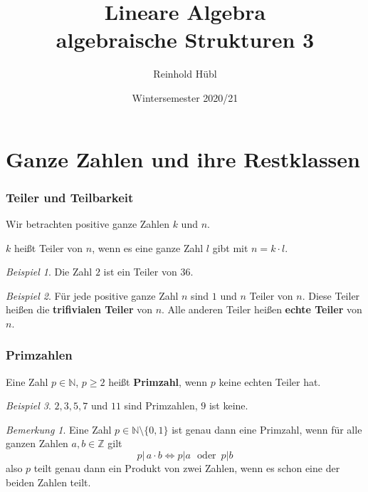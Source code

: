\documentclass[hyperref={pdfpagelabels=false}]{beamer}
\title{Lineare Algebra \\ algebraische Strukturen 3}
\author{ Reinhold Hübl}
\date{Wintersemester 2020/21}
\theoremstyle{plain}%
\theoremstyle{definition}
\theoremstyle{remark}
\newtheorem*{beispiel}{Beispiel}
\newtheorem*{notiz}{Bemerkung}
\begin{document}
\begin{frame}
\titlepage
\centering 
 
\end{frame} 



\section{Ganze Zahlen und ihre Restklassen}


\begin{frame}
\frametitle{Teiler und Teilbarkeit}

Wir betrachten positive ganze Zahlen $k$ und $n$. 

\begin{definition}  $k$ heißt Teiler von $n$, wenn es eine ganze Zahl $l$ gibt mit $n = k \cdot l$. 
\end{definition}

\pause 
\begin{beispiel} Die Zahl $2$ ist ein Teiler von $36$. \end{beispiel} 
\pause 
\begin{beispiel}
Für jede positive ganze Zahl $n$ sind $1$ und $n$ Teiler von $n$. Diese Teiler heißen die \textbf{trifivialen Teiler} 
von $n$. Alle anderen Teiler heißen \textbf{echte Teiler} von $n$. 
\end{beispiel}


\end{frame}

\begin{frame}
\frametitle{Primzahlen}

\begin{definition} Eine Zahl $p \in \mathbb N$, $p \geq 2$ heißt \textbf{Primzahl}, 
wenn $p$ keine echten Teiler hat.
\end{definition}

\pause 

\begin{beispiel} $2, 3, 5, 7$ und $11$ sind Primzahlen, $9$ ist keine.
\end{beispiel}

\pause 

\begin{notiz} Eine Zahl $p \in \mathbb N \setminus \{0, 1\}$ ist genau dann eine Primzahl, wenn 
für alle ganzen Zahlen $a, b \in \mathbb Z$ gilt
  	$$ p \vert \, a \cdot b \iff p \vert a  \,\, \textrm{ oder } \, p \vert b $$
also $p$ teilt genau dann ein Produkt von zwei Zahlen, wenn es schon eine der beiden Zahlen teilt.
\end{notiz}

\end{frame}
\end{document}
